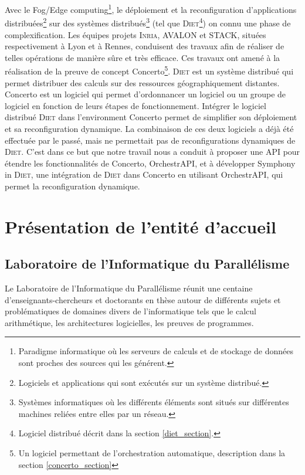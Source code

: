 \documentclass{article}
\newcommand{\api}{API\xspace}
\newcommand{\LIP}{Laboratoire de l'Informatique du Parallélisme\xspace}
\newcommand{\INRIA}{\textsc{Inria}\xspace}
\newcommand{\avalon}{AVALON\xspace}
\newcommand{\stack}{STACK\xspace}
\newcommand{\diet}{\textsc{Diet}\xspace} %
\newcommand{\concerto}{Concerto\xspace}
\newcommand{\symphonyind}{Symphony in \diet} %
\newcommand{\orchestrapi}{OrchestrAPI\xspace}
\begin{document}
Avec le Fog/Edge computing\footnote{Paradigme informatique où les serveurs de
calculs et de stockage de données sont proches des sources qui les générent.},
le déploiement et la reconfiguration d’applications
distribuées\footnote{Logiciels et applications qui sont exécutés sur un système
distribué.} sur des systèmes distribués\footnote{Systèmes informatiques où les
différents éléments sont situés sur différentes machines reliées entre elles par
un réseau.} (tel que \diet\footnote{Logiciel distribué décrit dans la section
\ref{diet_section}.}) on connu une phase de complexification. Les équipes
projets \INRIA , \avalon et \stack, situées respectivement à Lyon et à Rennes, conduisent des
travaux afin de réaliser de telles opérations de manière sûre et très efficace.
Ces travaux ont amené à la réalisation de la preuve de concept
\concerto\footnote{Un logiciel permettant de l'orchestration automatique,
description dans la section \ref{concerto_section}}.
\diet est un système distribué qui permet distribuer des calculs sur des
ressources géographiquement distantes.
\concerto est un logiciel qui permet d'ordonnancer un logiciel ou un groupe de
logiciel en fonction de leurs étapes de fonctionnement.
Intégrer le logiciel distribué \diet dans l'environment \concerto permet de
simplifier son déploiement et sa reconfiguration dynamique.
La combinaison de ces deux logiciels a déjà été effectuée par le passé, mais ne
permettait pas de reconfigurations dynamiques de \diet.  C'est dans ce but que
notre travail nous a conduit à proposer une \api pour étendre les
fonctionnalités de \concerto, \orchestrapi, et à développer \symphonyind, une
intégration de \diet dans \concerto en utilisant \orchestrapi, qui permet la
reconfiguration dynamique.


\section{Présentation de l'entité d'accueil}

\subsection{\LIP}
Le \LIP réunit une centaine d'enseignants-chercheurs et doctorants en thèse
autour de différents sujets et problématiques de domaines divers de
l'informatique tels que le calcul arithmétique, les architectures logicielles,
les preuves de programmes.
\end{document}
